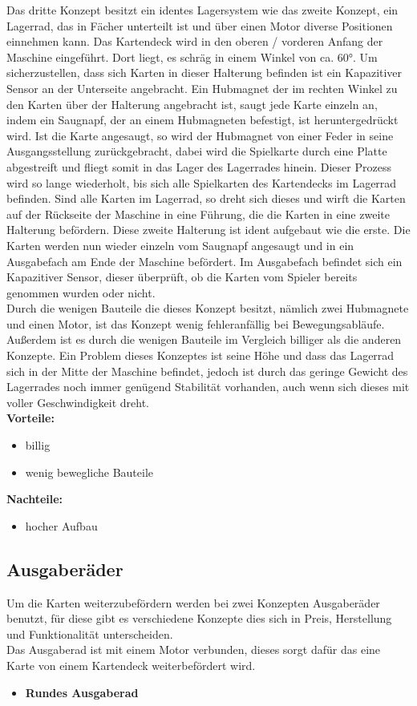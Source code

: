 Das dritte Konzept besitzt ein identes Lagersystem wie das zweite Konzept, ein Lagerrad, das in Fächer unterteilt ist und über einen Motor diverse Positionen einnehmen kann.
Das Kartendeck wird in den oberen / vorderen Anfang der Maschine eingeführt. Dort liegt, es schräg in einem Winkel von ca. 60°. Um sicherzustellen, dass sich Karten in dieser Halterung befinden
ist ein Kapazitiver Sensor an der Unterseite angebracht. Ein Hubmagnet der im rechten Winkel zu den Karten über der Halterung angebracht ist, saugt jede Karte einzeln an, indem ein Saugnapf, der an einem Hubmagneten
befestigt, ist heruntergedrückt wird. Ist die Karte angesaugt, so wird der Hubmagnet von einer Feder in seine Ausgangsstellung zurückgebracht, dabei wird die Spielkarte durch eine Platte abgestreift und fliegt somit in das Lager des
Lagerrades hinein. Dieser Prozess wird so lange wiederholt, bis sich alle Spielkarten des Kartendecks im Lagerrad befinden. Sind alle Karten im Lagerrad, so dreht sich dieses und wirft die Karten auf der Rückseite der Maschine in eine Führung, die die Karten in eine zweite Halterung befördern. Diese zweite Halterung ist ident aufgebaut wie die erste. Die Karten werden nun wieder einzeln vom Saugnapf angesaugt und in ein Ausgabefach am Ende der Maschine befördert. Im Ausgabefach befindet sich
ein Kapazitiver Sensor, dieser überprüft, ob die Karten vom Spieler bereits genommen wurden oder nicht.\\

Durch die wenigen Bauteile die dieses Konzept besitzt, nämlich zwei Hubmagnete und einen Motor, ist das Konzept wenig fehleranfällig bei Bewegungsabläufe. Außerdem ist es
durch die wenigen Bauteile im Vergleich billiger als die anderen Konzepte. Ein Problem dieses Konzeptes ist seine Höhe und dass das Lagerrad sich in der Mitte der Maschine befindet,
jedoch ist durch das geringe Gewicht des Lagerrades noch immer genügend Stabilität vorhanden, auch wenn sich dieses mit voller Geschwindigkeit dreht. \\

\textbf{Vorteile:}
\begin{itemize}
    \item billig
    \item wenig bewegliche Bauteile
\end{itemize}
\textbf{Nachteile:}
\begin{itemize}
    \item hocher Aufbau
\end{itemize}

 \subsection{Ausgaberäder}
Um die Karten weiterzubefördern werden bei zwei Konzepten Ausgaberäder benutzt, für diese gibt es verschiedene Konzepte dies sich in Preis, Herstellung und Funktionalität unterscheiden.\\
Das Ausgaberad ist mit einem Motor verbunden, dieses sorgt dafür das eine Karte von einem Kartendeck weiterbefördert wird.
\begin{itemize}
    \item \textbf{Rundes Ausgaberad}
\end{itemize}

